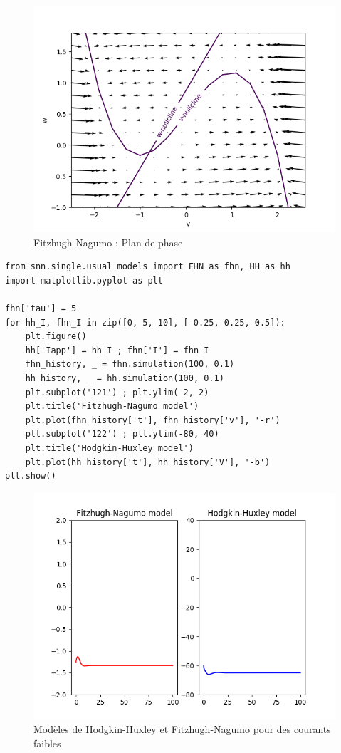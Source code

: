 \documentclass[12pt]{scrartcl}
\begin{document}
\begin{figure}[!h]
\centering
\includegraphics[scale=0.7]{imgs/FNPDP.png}
\caption{Fitzhugh-Nagumo : Plan de phase}
\label{FNPDP}
\end{figure}

\clearpage
\begin{lstlisting}[caption = {Comparaison des comportements des modèles de Fitzhugh-Nagumo et Hodgkin-Huxley}]
from snn.single.usual_models import FHN as fhn, HH as hh
import matplotlib.pyplot as plt

fhn['tau'] = 5
for hh_I, fhn_I in zip([0, 5, 10], [-0.25, 0.25, 0.5]):
    plt.figure()
    hh['Iapp'] = hh_I ; fhn['I'] = fhn_I
    fhn_history, _ = fhn.simulation(100, 0.1)
    hh_history, _ = hh.simulation(100, 0.1)
    plt.subplot('121') ; plt.ylim(-2, 2) 
    plt.title('Fitzhugh-Nagumo model')
    plt.plot(fhn_history['t'], fhn_history['v'], '-r')
    plt.subplot('122') ; plt.ylim(-80, 40) 
    plt.title('Hodgkin-Huxley model')
    plt.plot(hh_history['t'], hh_history['V'], '-b') 
plt.show()
\end{lstlisting}

\begin{figure}[!h]
\centering
\includegraphics[scale=0.5]{imgs/hhfhnfaible.png}
\caption{Modèles de Hodgkin-Huxley et Fitzhugh-Nagumo pour des courants faibles}
\label{hhfhnfaible}
\end{figure}
\end{document}
